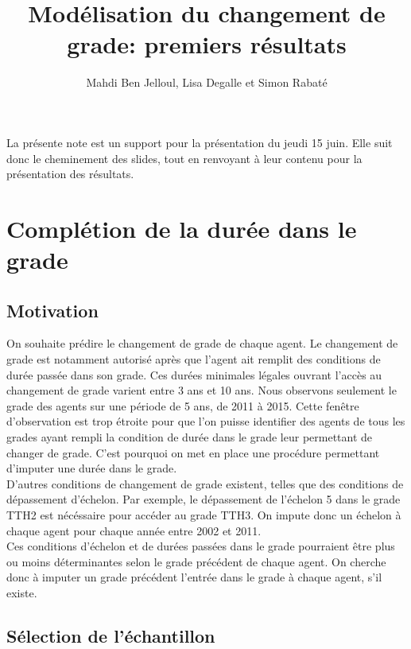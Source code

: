 \documentclass[11pt,a4paper]{article}
\begin{document}
\title{Modélisation du changement de grade: premiers résultats}


\author{Mahdi Ben Jelloul, Lisa Degalle et Simon Rabat\'e}


\maketitle


La présente note est un support pour la présentation du jeudi 15 juin. Elle suit donc le cheminement des slides, tout en renvoyant à leur contenu pour la présentation des résultats. 


\section{Complétion de la durée dans le grade}
\subsection{Motivation}

On souhaite prédire le changement de grade de chaque agent. Le changement de grade est notamment autorisé après que l'agent ait remplit des conditions de durée passée dans son grade. Ces durées minimales légales ouvrant l'accès au changement de grade varient entre 3 ans et 10 ans. Nous observons seulement le grade des agents sur une période de 5 ans, de 2011 à 2015. Cette fenêtre d'observation est trop étroite pour que l'on puisse identifier des agents de tous les grades ayant rempli la condition de durée dans le grade leur permettant de changer de grade. C'est pourquoi on met en place une procédure permettant d'imputer une durée dans le grade.\\
\indent D'autres conditions de changement de grade existent, telles que des conditions de dépassement d'échelon. Par exemple, le dépassement de l'échelon 5 dans le grade TTH2 est nécéssaire pour accéder au grade TTH3. On impute donc un échelon à chaque agent pour chaque année entre 2002 et 2011.\\
\indent Ces conditions d'échelon et de durées passées dans le grade pourraient être plus ou moins déterminantes selon le grade précédent de chaque agent. On cherche donc à imputer un grade précédent l'entrée dans le grade à chaque agent, s'il existe.

\subsection{Sélection de l'échantillon}
\end{document}
